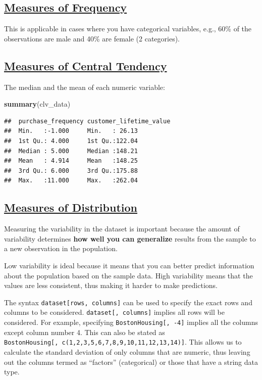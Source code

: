 \documentclass[
]{article}
\newenvironment{Shaded}{\begin{snugshade}}{\end{snugshade}}
\newcommand{\FunctionTok}[1]{\textcolor[rgb]{0.13,0.29,0.53}{\textbf{#1}}}
\newcommand{\NormalTok}[1]{#1}
\begin{document}
\subsection{\texorpdfstring{\ul{\textbf{Measures of
Frequency}}}{Measures of Frequency}}\label{measures-of-frequency}

This is applicable in cases where you have categorical variables, e.g.,
60\% of the observations are male and 40\% are female (2 categories).

\subsection{\texorpdfstring{\ul{\textbf{Measures of Central
Tendency}}}{Measures of Central Tendency}}\label{measures-of-central-tendency}

The median and the mean of each numeric variable:

\begin{Shaded}
\begin{Highlighting}[]
\FunctionTok{summary}\NormalTok{(clv\_data)}
\end{Highlighting}
\end{Shaded}

\begin{verbatim}
##  purchase_frequency customer_lifetime_value
##  Min.   :-1.000     Min.   : 26.13         
##  1st Qu.: 4.000     1st Qu.:122.04         
##  Median : 5.000     Median :148.21         
##  Mean   : 4.914     Mean   :148.25         
##  3rd Qu.: 6.000     3rd Qu.:175.88         
##  Max.   :11.000     Max.   :262.04
\end{verbatim}

\subsection{\texorpdfstring{\ul{\textbf{Measures of
Distribution}}}{Measures of Distribution}}\label{measures-of-distribution}

Measuring the variability in the dataset is important because the amount
of variability determines \textbf{how well you can generalize} results
from the sample to a new observation in the population.

Low variability is ideal because it means that you can better predict
information about the population based on the sample data. High
variability means that the values are less consistent, thus making it
harder to make predictions.

The syntax \texttt{dataset{[}rows,\ columns{]}} can be used to specify
the exact rows and columns to be considered.
\texttt{dataset{[},\ columns{]}} implies all rows will be considered.
For example, specifying \texttt{BostonHousing{[},\ -4{]}} implies all
the columns except column number 4. This can also be stated as
\texttt{BostonHousing{[},\ c(1,2,3,5,6,7,8,9,10,11,12,13,14){]}}. This
allows us to calculate the standard deviation of only columns that are
numeric, thus leaving out the columns termed as ``factors''
(categorical) or those that have a string data type.
\end{document}
